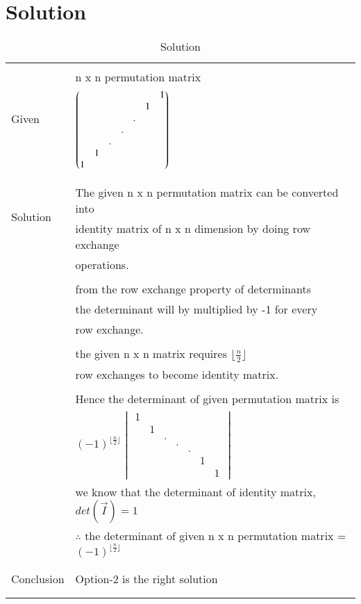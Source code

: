 \documentclass[journal,12pt]{IEEEtran}
\begin{document}
\section{\textbf{Solution}}
\renewcommand{\thetable}{1}
\begin{longtable}{|l|l|}
\hline
\multirow{3}{*}{Given} & \\
& n x n permutation matrix\\
& $\begin{pmatrix} & & & & & &1\\ & & & & &1& \\ & & & &.& & \\ & & &.& & & \\ & &.& & & & \\ &1& & & & & \\1& & & & & &  \end{pmatrix}$\\
&\\
\hline
\multirow{3}{*}{Solution} & \\
& The given n x n permutation matrix can be converted into \\
& identity matrix of n x n dimension by doing row exchange\\
& operations.\\
& \\
& from the row exchange property of determinants\\
& the determinant will by multiplied by -1 for every\\
& row exchange.\\
& \\
& the given n x n matrix requires $\lfloor \frac{n}{2} \rfloor$\\
& row exchanges to become identity matrix.\\
& \\
& Hence the determinant of given permutation matrix is\\
& $(-1)^{\lfloor \frac{n}{2} \rfloor}\begin{vmatrix}1& & & & & & \\ &1& & & & & \\ & &.& & & & \\ & & &.& & & \\ & & & &.& & \\ & & & & &1& \\ & & & & & &1  \end{vmatrix}$\\
& we know that the determinant of identity matrix, $det(\vec{I})=1$\\
& $\therefore$ the determinant of given n x n permutation matrix = $(-1)^{\lfloor \frac{n}{2} \rfloor}$\\
&\\
\hline
\multirow{3}{*}{Conclusion} & \\
& Option-2 is the right solution\\
&\\
\hline
\caption{Solution}
\label{table:1}
\end{longtable}
\end{document}
